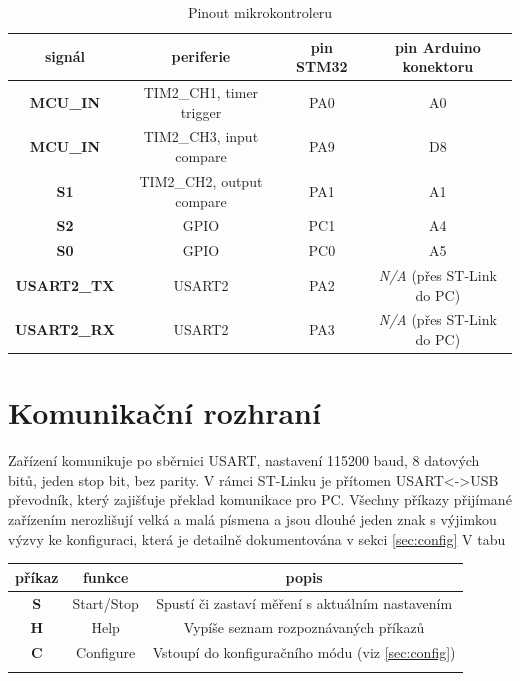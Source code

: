\documentclass[twoside]{article}
\begin{document}
\begin{table}[htbp]
    \centering
    \begin{tabular}{c|c|c|c}
        signál & periferie & pin STM32 & pin Arduino konektoru \\ \hline 
        \textbf{MCU\_IN} & TIM2\_CH1, timer trigger & PA0 & A0 \\
        \textbf{MCU\_IN} & TIM2\_CH3, input compare & PA9 & D8 \\
        \textbf{S1} & TIM2\_CH2, output compare & PA1 & A1 \\
        \textbf{S2} & GPIO & PC1 & A4 \\
        \textbf{S0} & GPIO & PC0 & A5 \\
        \textbf{USART2\_TX} & USART2 & PA2 & \textit{N/A} (přes ST-Link do PC)\\
        \textbf{USART2\_RX} & USART2 & PA3 & \textit{N/A} (přes ST-Link do PC)
    \end{tabular}
    \caption{Pinout mikrokontroleru}
    \label{table:pinout}
\end{table}


\section{Komunikační rozhraní}

Zařízení komunikuje po sběrnici USART, nastavení 115200 baud, 8 datových bitů, jeden stop bit,
bez parity. V rámci ST-Linku je přítomen USART<->USB převodník, který zajišťuje překlad komunikace pro PC.
Všechny příkazy přijímané zařízením nerozlišují velká a malá písmena a jsou dlouhé jeden znak
s výjimkou výzvy ke konfiguraci, která je detailně dokumentována v sekci \ref{sec:config}
V tabu

\begin{table}
    \centering
    \begin{tabular}{c|c|c}
        příkaz & funkce  & popis \\ \hline
        \textbf{S} & Start/Stop & Spustí či zastaví měření s aktuálním nastavením \\
        \textbf{H} & Help & Vypíše seznam rozpoznávaných příkazů \\
        \textbf{C} & Configure & Vstoupí do konfiguračního módu (viz \ref{sec:config}) \\
        \textbf{} &  &  \\       
    \end{tabular}
\end{table}
\end{document}
